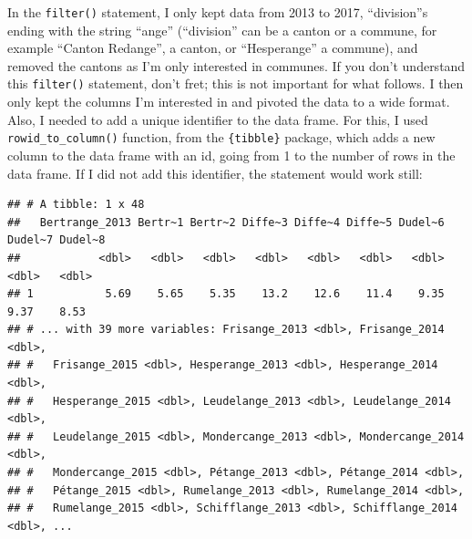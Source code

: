 \documentclass[
]{article}
\newenvironment{Shaded}{\begin{snugshade}}{\end{snugshade}}
\newcommand{\AttributeTok}[1]{\textcolor[rgb]{0.77,0.63,0.00}{#1}}
\newcommand{\DecValTok}[1]{\textcolor[rgb]{0.00,0.00,0.81}{#1}}
\newcommand{\FunctionTok}[1]{\textcolor[rgb]{0.00,0.00,0.00}{#1}}
\newcommand{\NormalTok}[1]{#1}
\newcommand{\OtherTok}[1]{\textcolor[rgb]{0.56,0.35,0.01}{#1}}
\newcommand{\SpecialCharTok}[1]{\textcolor[rgb]{0.00,0.00,0.00}{#1}}
\newcommand{\StringTok}[1]{\textcolor[rgb]{0.31,0.60,0.02}{#1}}
\begin{document}
In the \texttt{filter()} statement, I only kept data from 2013 to 2017, ``division''s ending with the string
``ange'' (``division'' can be a canton or a commune, for example ``Canton Redange'', a canton, or
``Hesperange'' a commune), and removed the cantons as I'm only interested in communes. If you don't
understand this \texttt{filter()} statement, don't fret; this is not important for what follows. I then
only kept the columns I'm interested in and pivoted the data to a wide format. Also, I needed to
add a unique identifier to the data frame. For this, I used \texttt{rowid\_to\_column()} function, from the
\texttt{\{tibble\}} package, which adds a new column to the data frame with an id, going from 1 to the
number of rows in the data frame. If I did not add this identifier, the statement would work still:

\begin{Shaded}
\end{Shaded}

\begin{verbatim}
## # A tibble: 1 x 48
##   Bertrange_2013 Bertr~1 Bertr~2 Diffe~3 Diffe~4 Diffe~5 Dudel~6 Dudel~7 Dudel~8
##            <dbl>   <dbl>   <dbl>   <dbl>   <dbl>   <dbl>   <dbl>   <dbl>   <dbl>
## 1           5.69    5.65    5.35    13.2    12.6    11.4    9.35    9.37    8.53
## # ... with 39 more variables: Frisange_2013 <dbl>, Frisange_2014 <dbl>,
## #   Frisange_2015 <dbl>, Hesperange_2013 <dbl>, Hesperange_2014 <dbl>,
## #   Hesperange_2015 <dbl>, Leudelange_2013 <dbl>, Leudelange_2014 <dbl>,
## #   Leudelange_2015 <dbl>, Mondercange_2013 <dbl>, Mondercange_2014 <dbl>,
## #   Mondercange_2015 <dbl>, Pétange_2013 <dbl>, Pétange_2014 <dbl>,
## #   Pétange_2015 <dbl>, Rumelange_2013 <dbl>, Rumelange_2014 <dbl>,
## #   Rumelange_2015 <dbl>, Schifflange_2013 <dbl>, Schifflange_2014 <dbl>, ...
\end{verbatim}
\end{document}
